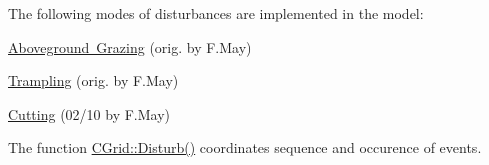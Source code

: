 The following modes of disturbances are implemented in the model\+:
\begin{DoxyItemize}
\item \mbox{\hyperlink{class_c_grid_a816b11d543422eeffc27e56c44b30d43}{Aboveground Grazing}} (orig. by F.\+May)
\item \mbox{\hyperlink{class_c_grid_a99267b09aab13f05bb87dd93bddf11bb}{Trampling}} (orig. by F.\+May)
\item \mbox{\hyperlink{class_c_grid_aeb32e3d96362cead28fd24871e47a087}{Cutting}} (02/10 by F.\+May)
\end{DoxyItemize}

The function \mbox{\hyperlink{class_c_grid_a684a34a53f8210acbd15926830d706c2}{C\+Grid\+::\+Disturb()}} coordinates sequence and occurence of events. 